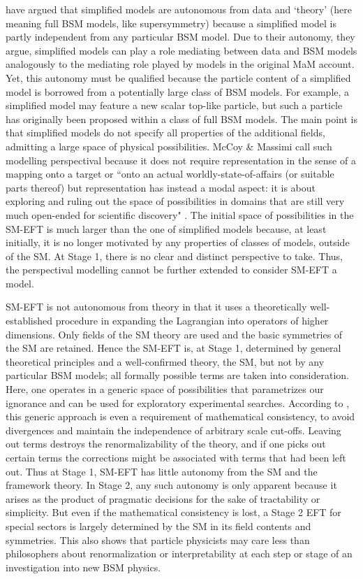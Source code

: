 \citet{mccoymassimi} have argued that simplified models are autonomous from data and `theory' (here meaning full BSM models, like supersymmetry) because a simplified model is partly independent from any particular BSM model. 
Due to their autonomy, they argue, simplified models can play a role mediating between data and BSM models analogously to the mediating role played by models in the original MaM account. 
Yet, this autonomy must be qualified because the particle content of a simplified model is borrowed from a potentially large class of BSM models. 
For example, a simplified model may feature a new scalar top-like particle, but such a particle has originally been proposed within a class of full BSM models. 
The main point is that simplified models do not specify all properties of the additional fields, admitting a large space of physical possibilities.
McCoy \& Massimi call such modelling perspectival because it does not require representation in the sense of a mapping onto a target or ``onto an actual worldly-state-of-affairs (or suitable parts thereof) but representation has instead a modal aspect: it is about exploring and ruling out the space of possibilities in domains that are still very much open-ended for scientific discovery" \citep[p.~338]{mccoymassimi}.
The initial space of possibilities in the SM-EFT is much larger than the one of simplified models because, at least initially, it is no longer motivated by any properties of classes of models, outside of the SM. 
At Stage 1, there is no clear and distinct perspective to take. 
Thus, the perspectival modelling cannot be further extended to consider SM-EFT a model.

SM-EFT is not autonomous from theory in that it uses a theoretically well-established procedure in expanding the Lagrangian into operators of higher dimensions. 
Only fields of the SM theory are used and the basic symmetries of the SM are retained. 
Hence the SM-EFT is, at Stage 1, determined by general theoretical principles and a well-confirmed theory, the SM, but not by any particular BSM models; all formally possible terms are taken into consideration.  
Here, one operates in a generic space of possibilities that parametrizes our ignorance and can be used for exploratory experimental searches. 
According to \cite{wells2012}, this generic approach is even a requirement of mathematical consistency, to avoid divergences and maintain the independence of arbitrary scale cut-offs. 
Leaving out terms destroys the renormalizability of the theory, and if one picks out certain terms the corrections might be associated with terms that had been left out. 
Thus at Stage 1, SM-EFT has little autonomy from the SM and the framework theory. 
In Stage 2, any such autonomy is only apparent because it arises as the product of pragmatic decisions for the sake of tractability or simplicity.
But even if the mathematical consistency is lost, a Stage 2 EFT for special sectors is largely determined by the SM in its field contents and symmetries. 
This also shows that particle physicists may care less than philosophers about renormalization or interpretability at each step or stage of an investigation into new BSM physics.


